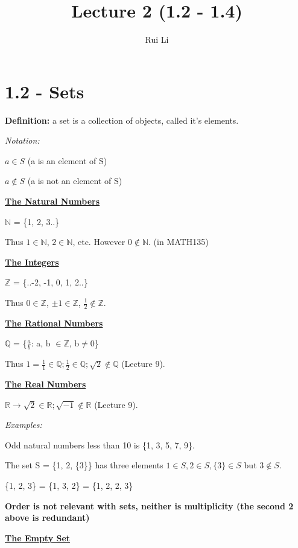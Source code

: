 \documentclass[11pt]{article}
\title{Lecture 2 (1.2 - 1.4)}
\author{Rui Li}
\begin{document}
\maketitle
\tableofcontents
\section*{1.2 - Sets}
    \textbf{Definition: }a set is a collection of objects, called it's elements.
    \smallskip

    \textit{Notation: }
    
    $a \in S$ (a is an element of S)
    
    $a \notin S$ (a is not an element of S)
    \bigskip

    \underline{\textbf{The Natural Numbers}}
    
    $\mathbb{N}$ = \{1, 2, 3..\}
    
    Thus $1 \in \mathbb{N}$, $2 \in \mathbb{N}$, etc. However $0 \notin \mathbb{N}$. (in MATH135)
    \bigskip

    \underline{\textbf{The Integers}}
    
    $\mathbb{Z}$ = \{..-2, -1, 0, 1, 2..\}
    
    Thus $0 \in \mathbb{Z}$, $\pm1 \in \mathbb{Z}$, $\frac{1}{2} \notin \mathbb{Z}$.
    \bigskip

    \underline{\textbf{The Rational Numbers}}

    $\mathbb{Q}$ = \{$\frac{a}{b}$: a, b $\in \mathbb{Z}$, b$\neq 0$\}

    Thus $1 = \frac{1}{1} \in \mathbb{Q}; \frac{1}{2} \in \mathbb{Q}; \sqrt{2} \notin \mathbb{Q}$ (Lecture 9).
    \bigskip

    \underline{\textbf{The Real Numbers}}

    $\mathbb{R} \rightarrow \sqrt{2} \in \mathbb{R}; \sqrt{-1} \notin \mathbb{R}$ (Lecture 9).
    \bigskip

    \textit{Examples:}
    
    Odd natural numbers less than 10 is \{1, 3, 5, 7, 9\}.

    The set S = \{1, 2, \{3\}\} has three elements $1 \in S, 2 \in S, \{3\} \in S$ but $3 \notin S$.

    \{1, 2, 3\} = \{1, 3, 2\} = \{1, 2, 2, 3\}
    \bigskip

    \textbf{Order is not relevant with sets, neither is multiplicity (the second 2 above is redundant)}
    \medskip

    \underline{\textbf{The Empty Set}}
\end{document}
